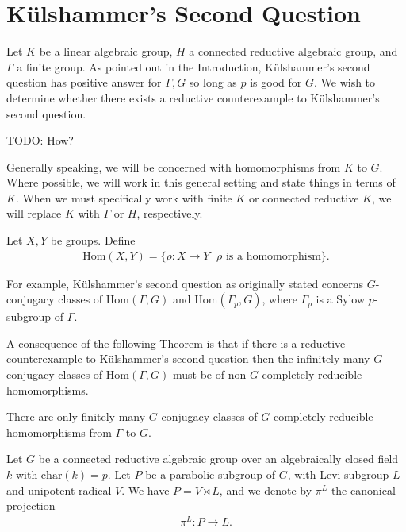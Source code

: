 
\chapter{K\"ulshammer's Second Question}
\label{Chapter4}

Let $K$ be a linear algebraic group, $H$ a connected reductive algebraic group, and $\Gamma$ a finite group.
As pointed out in the Introduction, K\"ulshammer's second question has positive answer for $\Gamma, G$ so long as $p$ is good for $G$. We wish to determine whether there exists a reductive counterexample to K\"ulshammer's second question.

TODO: How?

Generally speaking, we will be concerned with homomorphisms from $K$ to $G$. Where possible, we will work in this general setting and state things in terms of $K$. When we must specifically work with finite $K$ or connected reductive $K$, we will replace $K$ with $\Gamma$ or $H$, respectively.
\begin{definition} Let $X,Y$ be groups. Define
\begin{align*} \mathrm{Hom}(X, Y) = \{ \rho : X \rightarrow Y \,|\, \rho \textrm{ is a homomorphism}\}. 
\end{align*}
\end{definition}

For example, K\"ulshammer's second question as originally stated concerns $G$-conjugacy classes of $\mathrm{Hom}(\Gamma, G)$ and $\mathrm{Hom}(\Gamma_p, G)$, where $\Gamma_p$ is a Sylow $p$-subgroup of $\Gamma$.

A consequence of the following Theorem \cite[Theorem 1.2]{martin2003reductive} is that if there is a reductive counterexample to K\"ulshammer's second question then the infinitely many $G$-conjugacy classes of $\mathrm{Hom}(\Gamma, G)$ must be of non-$G$-completely reducible homomorphisms.

\begin{theorem} \label{thm:finiteGCR} There are only finitely many $G$-conjugacy classes of $G$-completely reducible homomorphisms from $\Gamma$ to $G$.
\end{theorem}
Let $G$ be a connected reductive algebraic group over an algebraically closed field $k$ with $\mathrm{char}(k) = p$. Let $P$ be a parabolic subgroup of $G$, with Levi subgroup $L$ and unipotent radical $V$. We have $P = V \rtimes L$, and we denote by $\pi^L$ the canonical projection
\begin{align*} \pi^L:P \rightarrow L. \end{align*}

